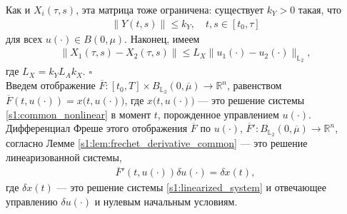 \documentclass[../main.tex]{subfiles}
\begin{document}
Как и $X_i(\tau,s)$, эта матрица тоже ограничена: существует $k_Y>0$ такая, что
\begin{gather*}
    \|Y(t,s)\| \leqslant k_Y, \quad t,s \in [t_0, \tau]
\end{gather*}
для всех $u(\cdot) \in B(0,\mu)$.
Наконец, имеем 
\begin{gather*}
    \| X_1(\tau,s) - X_2(\tau,s) \| \leqslant L_X \| u_1(\cdot) - u_2(\cdot) \|_{\mathbb{L}_2}, 
\end{gather*} 
где $ L_X = k_Y L_A k_X$.
\hfill$\square$\\[1ex]%
Введем отображение $\overline{F}: [t_0,T]  \times B_{\mathbb{L}_2}(0,\overline{\mu}) \to \mathbb{R}^n$, равенством $\overline{F}(t, u(\cdot)) = x \big(t, u(\cdot)\big) $, где $x \big(t, u(\cdot)\big)$ --- это решение системы \eqref{s1:common_nonlinear} в момент $t$, порожденное управлением $u(\cdot)$.
Дифференциал Фреше этого отображения $\overline{F}$ по $u(\cdot)$, $\overline{F}': B_{\mathbb{L}_2}(0,\overline{\mu}) \to \mathbb{R}^n $, согласно Лемме \ref{s1:lem:frechet_derivative_common} --- это решение линеаризованной системы, 
\begin{gather*}%
    \overline{F}'(t, u(\cdot)) \delta u(\cdot) = \delta x(t), 
\end{gather*}
где $\delta x(t)$ --- это решение системы \eqref{s1:linearized_system} и отвечающее управлению $\delta u(\cdot)$ и нулевым начальным условиям.
    
\end{document}
